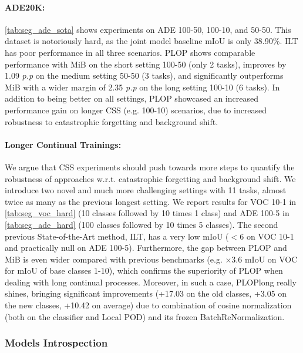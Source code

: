 \paragraph{ADE20K:} \autoref{tab:seg_ade_sota} shows experiments on ADE 100-50, 100-10, and
50-50. This dataset is notoriously hard, as the joint model baseline \ac{mIoU} is only 38.90\%. ILT
has poor performance in all three scenarios. PLOP shows comparable performance with MiB on the short
setting 100-50 (only 2 tasks), improves by 1.09 \textit{p.p} on the medium setting 50-50 (3 tasks),
and significantly outperforms MiB with a wider margin of 2.35 \textit{p.p} on the long setting
100-10 (6 tasks). In addition to being better on all settings, PLOP showcased an increased
performance gain on longer \ac{CSS} (e.g. 100-10) scenarios, due to increased robustness to catastrophic
forgetting and background shift.


\paragraph{Longer Continual Trainings:}We argue that \ac{CSS} experiments should push towards
more steps
\citep{wortsman2020supermasks,lomonaco2020ar1,douillard2020podnet,castro2018end_to_end_inc_learn} to
quantify the robustness of approaches w.r.t. catastrophic forgetting and background shift. We
introduce two novel and much more challenging settings with 11 tasks, almost twice as many as the
previous longest setting. We report results for VOC 10-1 in \autoref{tab:seg_voc_hard} (10 classes
followed by 10 times 1 class) and ADE 100-5 in \autoref{tab:seg_ade_hard} (100 classes followed by
10 times 5 classes). The second previous State-of-the-Art method, ILT, has a very low \ac{mIoU}
($<6$ on VOC 10-1 and practically null on ADE 100-5). Furthermore, the gap between PLOP and MiB is
even wider compared with previous benchmarks (e.g. $\times$3.6 \ac{mIoU} on VOC for \ac{mIoU} of
base classes 1-10), which confirms the superiority of PLOP when dealing with long continual
processes. Moreover, in such a case, PLOPlong really shines, bringing significant improvements
(+17.03 \pp on the old classes, +3.05 \pp on the new classes, +10.42 \pp on average) due to
combination of cosine normalization (both on the classifier and Local POD) and its frozen
BatchReNormalization.

\subsubsection{Models Introspection}

